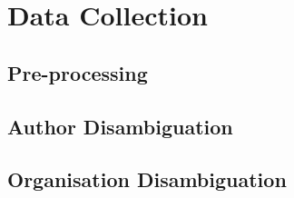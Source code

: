 \section{Data Collection}

\subsection{Pre-processing}

\subsection{Author Disambiguation}

\subsection{Organisation Disambiguation}
